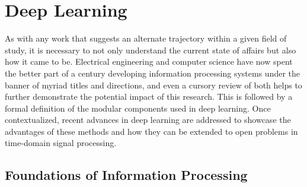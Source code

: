

\graphicspath{{3/figures/}}

\chapter{Deep Learning}
\label{chp:background}

As with any work that suggests an alternate trajectory within a given field of study, it is necessary to not only understand the current state of affairs but also how it came to be.
Electrical engineering and computer science have now spent the better part of a century developing information processing systems under the banner of myriad titles and directions, and even a cursory review of both helps to further demonstrate the potential impact of this research.
This is followed by a formal definition of the modular components used in deep learning.
Once contextualized, recent advances in deep learning are addressed to showcase the advantages of these methods and how they can be extended to open problems in time-domain signal processing.


\section{Foundations of Information Processing}
\label{sec:foundations}

